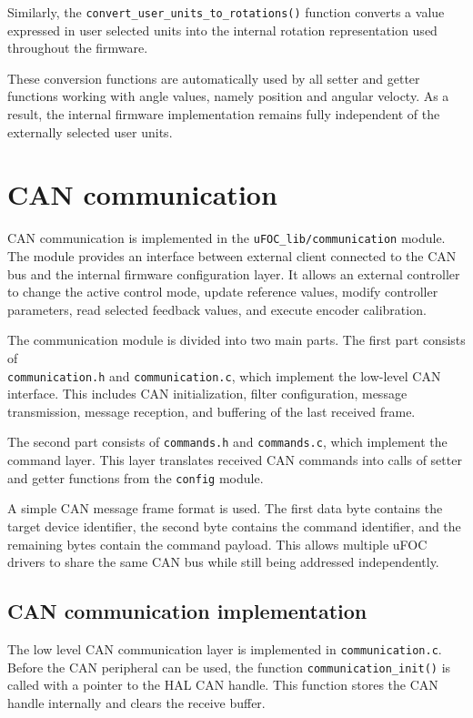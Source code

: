 Similarly, the \texttt{convert\_user\_units\_to\_rotations()} function converts a value expressed in user selected units
into the internal rotation representation used throughout the firmware.

These conversion functions are automatically used by all setter and getter functions working with angle values, namely position and angular velocty.
As a result, the internal firmware implementation remains fully independent of the externally selected user units.

\section{CAN communication}
CAN communication is implemented in the \texttt{uFOC\_lib/communication} module.
The module provides an interface between external client connected to the CAN bus and the internal firmware configuration layer.
It allows an external controller to change the active control mode, update reference values, modify controller parameters, read selected feedback values, and execute encoder calibration.

The communication module is divided into two main parts.
The first part consists of\\ \texttt{communication.h} and \texttt{communication.c}, which implement the low-level CAN interface.
This includes CAN initialization, filter configuration, message transmission, message reception, and buffering of the last received frame.

The second part consists of \texttt{commands.h} and \texttt{commands.c}, which implement the command layer.
This layer translates received CAN commands into calls of setter and getter functions from the \texttt{config} module.

A simple CAN message frame format is used.
The first data byte contains the target device identifier, the second byte contains the command identifier, and the remaining bytes contain the command payload.
This allows multiple uFOC drivers to share the same CAN bus while still being addressed independently.

\subsection{CAN communication implementation}
The low level CAN communication layer is implemented in \texttt{communication.c}.
Before the CAN peripheral can be used, the function \texttt{communication\_init()} is called with a pointer to the HAL CAN handle.
This function stores the CAN handle internally and clears the receive buffer.

